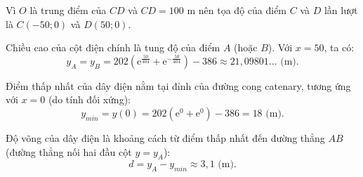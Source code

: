 \begin{ex}
{\begin{center}
		\end{center}
		Vì $O$ là trung điểm của $CD$ và $CD = 100$ m nên tọa độ của điểm $C$ và $D$ lần lượt là $C(-50; 0)$ và $D(50; 0)$.
		
		Chiều cao của cột điện chính là tung độ của điểm $A$ (hoặc $B$). Với $x = 50$, ta có:
		$$y_A = y_B = 202 \left( \mathrm{e}^{\tfrac{50}{404}} + \mathrm{e}^{-\tfrac{50}{404}} \right) - 386\approx 21{,}09801... \text{ (m)}.$$
		
		Điểm thấp nhất của dây điện nằm tại đỉnh của đường cong catenary, tương ứng với $x = 0$ (do tính đối xứng):
		$$y_{min} = y(0) = 202 \left( \mathrm{e}^0 + \mathrm{e}^0 \right) - 386 = 18 \text{ (m)}.$$
		
		Độ võng của dây điện là khoảng cách từ điểm thấp nhất đến đường thẳng $AB$ (đường thẳng nối hai đầu cột $y = y_A$):
		$$d = y_A - y_{min}  \approx 3{,}1 \text{ (m)}.$$
		
		
		
	}
\end{ex}

